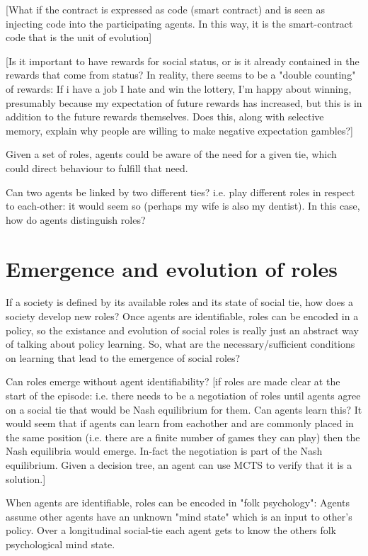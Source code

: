 \documentclass[a4paper]{article}
\begin{document}
[What if the contract is expressed as code (smart contract) and is seen as injecting code into the participating agents. In this way, it is the smart-contract code that is the unit of evolution]

[Is it important to have rewards for social status, or is it already contained in the rewards that come from status? In reality, there seems to be a "double counting" of rewards: If i have a job I hate and win the lottery, I'm happy about winning, presumably because my expectation of future rewards has increased, but this is in addition to the future rewards themselves. Does this, along with selective memory, explain why people are willing to make negative expectation gambles?]

Given a set of roles, agents could be aware of the need for a given tie, which could direct behaviour to fulfill that need.

Can two agents be linked by two different ties? i.e. play different roles in respect to each-other: it would seem so (perhaps my wife is also my dentist). In this case, how do agents distinguish roles?

\section{Emergence and evolution of roles}

If a society is defined by its available roles and its state of social tie, how does a society develop new roles? Once agents are identifiable, roles can be encoded in a policy, so the existance and evolution of social roles is really just an abstract way of talking about policy learning. So, what are the necessary/sufficient conditions on learning that lead to the emergence of social roles?

Can roles emerge without agent identifiability? [if roles are made clear at the start of the episode: i.e. there needs to be a negotiation of roles until agents agree on a social tie that would be Nash equilibrium for them. Can agents learn this? It would seem that if agents can learn from eachother and are commonly placed in the same position (i.e. there are a finite number of games they can play) then the Nash equilibria would emerge. In-fact the negotiation is part of the Nash equilibrium. Given a decision tree, an agent can use MCTS to verify that it is a solution.]

When agents are identifiable, roles can be encoded in "folk psychology": Agents assume other agents have an unknown "mind state" which is an input to other's policy. Over a longitudinal social-tie each agent gets to know the others folk psychological mind state.
\end{document}
